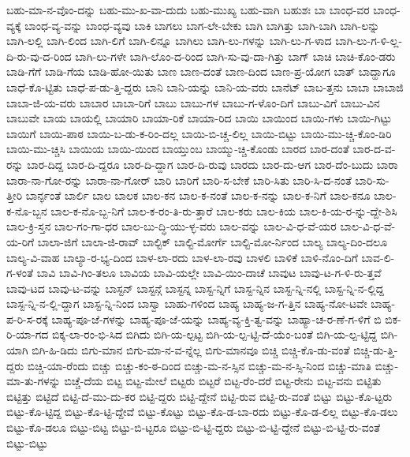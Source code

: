 {ಬಹು-ಮಾ-ನ-ವೊಂ-ದನ್ನು
ಬಹು-ಮು-ಖ-ವಾ-ದುದು
ಬಹು-ಮುಖ್ಯ
ಬಹು-ವಾಗಿ
ಬಹುಶಃ
ಬಾ
ಬಾಂಧ-ವರ
ಬಾಂಧ-ವ್ಯಕ್ಕೆ
ಬಾಂಧ-ವ್ಯ-ವನ್ನು
ಬಾಂಧ-ವ್ಯವು
ಬಾಕಿ
ಬಾಗಲು
ಬಾಗ-ಲೇ-ಬೇಕು
ಬಾಗಿ
ಬಾಗಿತ್ತು
ಬಾಗಿ-ಬಾಗಿ
ಬಾಗಿ-ಲನ್ನು
ಬಾಗಿ-ಲಲ್ಲಿ
ಬಾಗಿ-ಲಿಂದ
ಬಾಗಿ-ಲಿಗೆ
ಬಾಗಿ-ಲಿನ್ನೂ
ಬಾಗಿಲು
ಬಾಗಿ-ಲು-ಗಳನ್ನು
ಬಾಗಿ-ಲು-ಗ-ಳಾದ
ಬಾಗಿ-ಲು-ಗ-ಳಿ-ಲ್ಲ-ದಿ-ರು-ವು-ದ-ರಿಂದ
ಬಾಗಿ-ಲು-ಗಳೇ
ಬಾಗಿ-ಲೊಂ-ದ-ರಿಂದ
ಬಾಗಿ-ಸು-ವು-ದಾ-ಗಿತ್ತು
ಬಾಗ್
ಬಾಚಿ
ಬಾಚಿ-ಕೊಂ-ಡರು
ಬಾಡಿ-ಗೆಗೆ
ಬಾಡಿ-ಗೆಯ
ಬಾಡಿ-ಹೋ-ಯಿತು
ಬಾಣ
ಬಾಣ-ದಂತೆ
ಬಾಣ-ದಿಂದ
ಬಾಣ-ಪ್ರ-ಯೋಗ
ಬಾತ್
ಬಾದ್ಹಾಗೂ
ಬಾಧೆ-ಕೊ-ಟ್ಟಿತು
ಬಾಧೆ-ಪ-ಡು-ತ್ತಿ-ದ್ದರು
ಬಾನಿ
ಬಾನಿ-ಯನ್ನು
ಬಾನಿ-ಯ-ವರು
ಬಾನೆಟ್
ಬಾಬ-ತ್ತನು
ಬಾಬಾ
ಬಾಬಾಜಿ
ಬಾಬಾ-ಜಿ-ಯ-ವರು
ಬಾಬಾರ
ಬಾಬಾ-ರಿಗೆ
ಬಾಬು
ಬಾಬು-ಗಳ
ಬಾಬು-ಗ-ಳೊಂ-ದಿಗೆ
ಬಾಬು-ವಿಗೆ
ಬಾಬು-ವಿನ
ಬಾಬುವೇ
ಬಾಯ
ಬಾಯಲ್ಲಿ
ಬಾಯಾರಿ
ಬಾಯಾ-ರಿಕೆ
ಬಾಯಾ-ರಿದ
ಬಾಯಿ
ಬಾಯಿಂದ
ಬಾಯಿ-ಗಳು
ಬಾಯಿ-ಗಿಟ್ಟು
ಬಾಯಿಗೆ
ಬಾಯಿ-ಪಾಠ
ಬಾಯಿ-ಬ-ಡು-ಕ-ರಿಂ-ದಲ್ಲ
ಬಾಯಿ-ಬಿ-ಚ್ಚ-ಲಿಲ್ಲ
ಬಾಯಿ-ಬಿಟ್ಟು
ಬಾಯಿ-ಮು-ಚ್ಚಿ-ಕೊಂ-ಡಿರಿ
ಬಾಯಿ-ಮು-ಚ್ಚಿಸಿ
ಬಾಯಿಯ
ಬಾಯಿ-ಯಿಂದ
ಬಾಯ್ತುಂಬ
ಬಾಯ್ಮು-ಚ್ಚಿ-ಕೊಂಡು
ಬಾರದ
ಬಾರ-ದಂತೆ
ಬಾರ-ದ-ವ-ರನ್ನು
ಬಾರ-ದಿದ್ದ
ಬಾರ-ದಿ-ದ್ದರೂ
ಬಾರ-ದಿ-ದ್ದಾಗ
ಬಾರ-ದಿ-ರುವು
ಬಾರದು
ಬಾರ-ದು-ಆಗ
ಬಾರ-ದೆಂ-ಬುದು
ಬಾರಾ
ಬಾರಾ-ನಾ-ಗೋ-ರನ್ನು
ಬಾರಾ-ನಾ-ಗೋರ್
ಬಾರಿ
ಬಾರಿಗೆ
ಬಾರಿ-ಸ-ಬೇಕೆ
ಬಾರಿ-ಸಿತು
ಬಾರಿ-ಸಿ-ದ-ನಂತೆ
ಬಾರಿ-ಸು-ತ್ತೀರಿ
ಬಾರ್ನ್ಳಂತೆ
ಬಾರ್ಲಿ
ಬಾಲ
ಬಾಲಕ
ಬಾಲ-ಕನ
ಬಾಲ-ಕ-ನಂತೆ
ಬಾಲ-ಕ-ನನ್ನು
ಬಾಲ-ಕ-ನಿಗೆ
ಬಾಲ-ಕನೂ
ಬಾಲ-ಕ-ನೊ-ಬ್ಬನ
ಬಾಲ-ಕ-ನೊ-ಬ್ಬ-ನಿಗೆ
ಬಾಲ-ಕ-ರಂ-ತಿ-ರು-ತ್ತಾರೆ
ಬಾಲ-ಕರು
ಬಾಲ-ಕಿಯ
ಬಾಲ-ಕಿ-ಯ-ರ-ನ್ನು-ದ್ದೇ-ಶಿಸಿ
ಬಾಲ-ಕ್ರಿ-ಸ್ತನ
ಬಾಲ-ಗಂ-ಗಾ-ಧರ
ಬಾಲ-ಬು-ದ್ಧಿ-ಯು-ಳ್ಳ-ವರು
ಬಾಲ-ವನ್ನು
ಬಾಲ-ವಿ-ಧ-ವೆ-ಯರ
ಬಾಲ-ವಿ-ಧ-ವೆ-ಯ-ರಿಗೆ
ಬಾಲಾ-ಜಿಗೆ
ಬಾಲಾ-ಜಿ-ರಾವ್
ಬಾಲ್ಟಿಕ್
ಬಾಲ್ಟಿ-ಮೋರ್ಗೆ
ಬಾಲ್ಟಿ-ಮೋ-ರ್ನಿಂದ
ಬಾಲ್ಯ
ಬಾಲ್ಯ-ದಿಂ-ದಲೂ
ಬಾಲ್ಯ-ವಿ-ವಾಹ
ಬಾಲ್ಯಾ-ರ-ಭ್ಯ-ದಿಂದ
ಬಾಳ-ಲಾ-ರದು
ಬಾಳ-ಲಾ-ರವು
ಬಾಳಲಿ
ಬಾಳಿಕೆ
ಬಾಳಿ-ನೊಂ-ದಿಗೆ
ಬಾವ-ಲಿ-ಗ-ಳಂತೆ
ಬಾವಿ
ಬಾವಿ-ಗಿಂ-ತಲೂ
ಬಾವಿಯ
ಬಾವಿ-ಯಲ್ಲೇ
ಬಾವಿ-ಯಿಂ-ದಾಚೆ
ಬಾವುಟ
ಬಾವು-ಟ-ಗ-ಳಿ-ರು-ತ್ತವೆ
ಬಾವು-ಟದ
ಬಾವು-ಟ-ವನ್ನು
ಬಾಸ್ಟನ್
ಬಾಸ್ಟನ್ಗೆ
ಬಾಸ್ಟನ್ನ
ಬಾಸ್ಟ-ನ್ನಿಗೆ
ಬಾಸ್ಟ-ನ್ನಿನ
ಬಾಸ್ಟ-ನ್ನಿ-ನಲ್ಲಿ
ಬಾಸ್ಟ-ನ್ನಿ-ನ-ಲ್ಲಿದ್ದ
ಬಾಸ್ಟ-ನ್ನಿ-ನ-ಲ್ಲಿ-ದ್ದಾಗ
ಬಾಸ್ಟ-ನ್ನಿ-ನಿಂದ
ಬಾಸ್ವಾ
ಬಾಹು-ಗಳಿಂದ
ಬಾಹ್ಯ
ಬಾಹ್ಯ-ಜ-ಗ-ತ್ತಿನ
ಬಾಹ್ಯ-ನೋ-ಟವೇ
ಬಾಹ್ಯ-ಪ-ರಿ-ಸ-ರಕ್ಕೆ
ಬಾಹ್ಯ-ಪೂ-ಜೆ-ಗಳನ್ನು
ಬಾಹ್ಯ-ಪೂ-ಜೆ-ಯನ್ನು
ಬಾಹ್ಯ-ವ್ಯ-ಕ್ತಿ-ತ್ವ-ವನ್ನು
ಬಾಹ್ಯಾ-ಚ-ರ-ಣೆ-ಗ-ಳಿಗೆ
ಬಿ
ಬಿಕ-ರಿ-ಯಾ-ಗದ
ಬಿಕ್ಕ-ಲಾ-ರಂ-ಭಿ-ಸಿದ
ಬಿಗಿದು
ಬಿಗಿ-ಯ-ಲ್ಪಟ್ಟ
ಬಿಗಿ-ಯ-ಲ್ಪ-ಟ್ಟಿ-ದೆ-ಯೆಂ-ಬಂತೆ
ಬಿಗಿ-ಯ-ಲ್ಪ-ಟ್ಟಿದ್ದ
ಬಿಗಿ-ಯಾಗಿ
ಬಿಗಿ-ಹಿ-ಡಿದು
ಬಿಗು-ಮಾನ
ಬಿಗು-ಮಾ-ನ-ವ-ನ್ನೆಲ್ಲ
ಬಿಗು-ಮಾನವೂ
ಬಿಚ್ಚಿ
ಬಿಚ್ಚಿ-ಕೊ-ಡು-ವಂತೆ
ಬಿಚ್ಚಿ-ಡು-ತ್ತಿ-ದ್ದರು
ಬಿಚ್ಚಿ-ಯಾ-ರೆಂದು
ಬಿಚ್ಚು
ಬಿಚ್ಚು-ಕಂ-ಠ-ದಿಂದ
ಬಿಚ್ಚು-ಮ-ನ-ಸ್ಸಿನ
ಬಿಚ್ಚು-ಮ-ನ-ಸ್ಸಿ-ನಿಂದ
ಬಿಚ್ಚು-ಮಾತಿ
ಬಿಚ್ಚು-ಮಾ-ತು-ಗಳನ್ನು
ಬಿಚ್ಚೆ-ದೆಯ
ಬಿಟ್ಟ
ಬಿಟ್ಟ-ಮೇಲೆ
ಬಿಟ್ಟರು
ಬಿಟ್ಟರೆ
ಬಿಟ್ಟ-ರೆಂ-ದರೆ
ಬಿಟ್ಟ-ರೇನು
ಬಿಟ್ಟ-ವನು
ಬಿಟ್ಟಿತು
ಬಿಟ್ಟಿತ್ತು
ಬಿಟ್ಟಿದೆ
ಬಿಟ್ಟಿ-ದೆ-ಮು-ದು-ಕರ
ಬಿಟ್ಟಿ-ದ್ದರು
ಬಿಟ್ಟಿ-ದ್ದೇನೆ
ಬಿಟ್ಟಿ-ರುವ
ಬಿಟ್ಟಿ-ರು-ವಂತೆ
ಬಿಟ್ಟು
ಬಿಟ್ಟು-ಕೊ-ಟ್ಟರು
ಬಿಟ್ಟು-ಕೊ-ಟ್ಟಿದ್ದ
ಬಿಟ್ಟು-ಕೊ-ಟ್ಟಿ-ದ್ದೇವೆ
ಬಿಟ್ಟು-ಕೊಟ್ಟು
ಬಿಟ್ಟು-ಕೊ-ಡ-ಬಾ-ರದು
ಬಿಟ್ಟು-ಕೊ-ಡ-ಲಿಲ್ಲ
ಬಿಟ್ಟು-ಕೊ-ಡಲು
ಬಿಟ್ಟು-ಕೊ-ಡಲೂ
ಬಿಟ್ಟು-ಬಿಟ್ಟ
ಬಿಟ್ಟು-ಬಿ-ಟ್ಟರೂ
ಬಿಟ್ಟು-ಬಿ-ಟ್ಟಿ-ದ್ದರು
ಬಿಟ್ಟು-ಬಿ-ಟ್ಟಿ-ದ್ದೇನೆ
ಬಿಟ್ಟು-ಬಿ-ಟ್ಟಿ-ರು-ವಂತೆ
ಬಿಟ್ಟು-ಬಿಟ್ಟು
}
